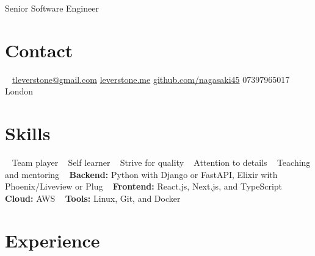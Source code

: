 \documentclass[]{friggeri-cv}
\begin{document}
       {Senior Software Engineer}



\begin{aside}
\section{Contact}
~
\href{mailto:tleverstone@gmail.com}{tleverstone@gmail.com}
\href{http://leverstone.me}{leverstone.me}
\href{https://github.com/nagasaki45}{github.com/nagasaki45}
07397965017
London
~
\section{Skills}
~
Team player
~
Self learner
~
Strive for quality
~
Attention to details
~
Teaching and mentoring
~
\textbf{Backend:} Python with Django or FastAPI, Elixir with Phoenix/Liveview or Plug
~
\textbf{Frontend:} React.js, Next.js, and TypeScript
~
\textbf{Cloud:} AWS
~
\textbf{Tools:} Linux, Git, and Docker
~
\end{aside}



\section{Experience}
\end{document}
